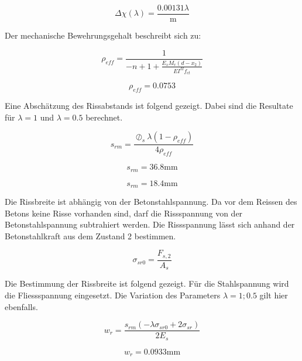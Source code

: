 \documentclass[
  12pt,
  letterpaper,
  egregdoesnotlikesansseriftitles]{scrreprt}
\begin{document}
\begin{equation}\Delta\chi{\left(\lambda \right)} = \frac{0.00131 \lambda}{\text{m}}\end{equation}

Der mechanische Bewehrungsgehalt beschreibt sich zu:

\begin{equation}\rho_{eff} = \frac{1}{- n + 1 + \frac{E_{s} M_{r} \left(d - x_{2}\right)}{EI^{II} f_{ct}}}\end{equation}

\begin{equation}\rho_{eff} = 0.0753\end{equation}

Eine Abschätzung des Rissabstands ist folgend gezeigt. Dabei sind die
Resultate für \(\lambda = 1\) und \(\lambda = 0.5\) berechnet.

\begin{equation}s_{rm} = \frac{\oslash_{s} \lambda \left(1 - \rho_{eff}\right)}{4 \rho_{eff}}\end{equation}

\begin{equation}s_{rm} = 36.8 \text{mm}\end{equation}

\begin{equation}s_{rm} = 18.4 \text{mm}\end{equation}

Die Rissbreite ist abhängig von der Betonstahlspannung. Da vor dem
Reissen des Betons keine Risse vorhanden sind, darf die Rissspannung von
der Betonstahlspannung subtrahiert werden. Die Rissspannung lässt sich
anhand der Betonstahlkraft aus dem Zustand 2 bestimmen.

\begin{equation}\sigma_{sr0} = \frac{F_{s,2}}{A_{s}}\end{equation}

Die Bestimmung der Rissbreite ist folgend gezeigt. Für die Stahlspannung
wird die Fliessspannung eingesetzt. Die Variation des Parameters
\(\lambda = 1 ; 0.5\) gilt hier ebenfalls.

\begin{equation}w_{r} = \frac{s_{rm} \left(- \lambda \sigma_{sr0} + 2 \sigma_{sr}\right)}{2 E_{s}}\end{equation}

\begin{equation}w_{r} = 0.0933 \text{mm}\end{equation}
\end{document}
